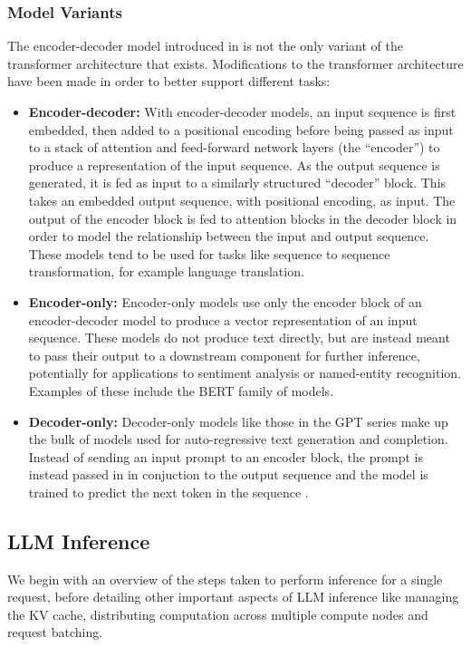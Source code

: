 \documentclass[12pt,twoside]{report}
\begin{document}
\subsubsection{Model Variants}
The encoder-decoder model introduced in \cite{vaswani2017attention} is not the only variant of the transformer architecture that exists.
Modifications to the transformer architecture have been made in order to better support different tasks:  
\begin{itemize}
  \item \textbf{Encoder-decoder:}
    With encoder-decoder models, an input sequence is first embedded, then added to a positional encoding before being passed as input to a stack of attention and feed-forward network layers (the ``encoder'') to produce a representation of the input sequence. 
    As the output sequence is generated, it is fed as input to a similarly structured ``decoder'' block. 
    This takes an embedded output sequence, with positional encoding, as input.
    The output of the encoder block is fed to attention blocks in the decoder block in order to model the relationship between the input and output sequence.
    These models \cite{raffel2020exploring} tend to be used for tasks like sequence to sequence transformation, for example language translation.
  \item \textbf{Encoder-only:}
    Encoder-only models use only the encoder block of an encoder-decoder model to produce a vector representation of an input sequence.
    These models do not produce text directly, but are instead meant to pass their output to a downstream component for further inference, potentially for applications to sentiment analysis or named-entity recognition.
    Examples of these include the BERT \cite{kenton2019bert} family of models.
  \item \textbf{Decoder-only:}
    Decoder-only models like those in the GPT \cite{radford2018improving} series make up the bulk of models used for auto-regressive text generation and completion. 
    Instead of sending an input prompt to an encoder block, the prompt is instead passed in in conjuction to the output sequence and the model is trained to predict the next token in the sequence \cite{dai2015semi}.
\end{itemize}

\subsection{LLM Inference}\label{subsection:llminference}
We begin with an overview of the steps taken to perform inference for a single request, before detailing other important aspects of LLM inference like managing the KV cache, distributing computation across multiple compute nodes and request batching.
\end{document}
